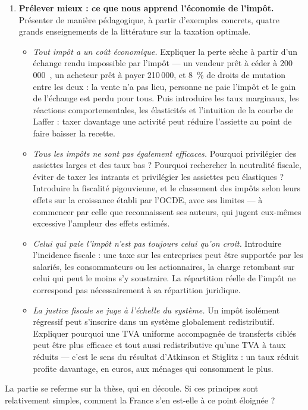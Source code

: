 \documentclass[11pt,a4paper]{article}
\providecommand{\euro}{\texteuro}
\newenvironment{chapitres}[1]
{\begin{enumerate}[leftmargin=1.6em,itemsep=0.15em,parsep=0pt,topsep=0.20em,start=#1]}
{\end{enumerate}}
\newenvironment{args}
{\begin{itemize}[leftmargin=1.1em,itemsep=0.1em,parsep=0pt,topsep=0.12em,label=\textbullet]}
{\end{itemize}}
\begin{document}
\begin{chapitres}{1}
\item \textbf{Prélever mieux : ce que nous apprend l'économie de l'impôt.} Présenter de manière
pédagogique, à partir d'exemples concrets, quatre grands enseignements de la littérature sur la
taxation optimale.
\begin{args}
\item \emph{Tout impôt a un coût économique.} Expliquer la perte sèche à partir d'un échange rendu
impossible par l'impôt --- un vendeur prêt à céder à 200\,000~\euro{}, un acheteur prêt à payer
210\,000, et 8~\% de droits de mutation entre les deux : la vente n'a pas lieu, personne ne paie
l'impôt et le gain de l'échange est perdu pour tous. Puis introduire les taux marginaux, les
réactions comportementales, les élasticités et l'intuition de la courbe de Laffer : taxer davantage
une activité peut réduire l'assiette au point de faire baisser la recette.
\item \emph{Tous les impôts ne sont pas également efficaces.} Pourquoi privilégier des assiettes
larges et des taux bas ? Pourquoi rechercher la neutralité fiscale, éviter de taxer les intrants et
privilégier les assiettes peu élastiques ? Introduire la fiscalité pigouvienne, et le classement des
impôts selon leurs effets sur la croissance établi par l'OCDE, avec ses limites --- à commencer par
celle que reconnaissent ses auteurs, qui jugent eux-mêmes excessive l'ampleur des effets estimés.
\item \emph{Celui qui paie l'impôt n'est pas toujours celui qu'on croit.} Introduire l'incidence
fiscale : une taxe sur les entreprises peut être supportée par les salariés, les consommateurs ou
les actionnaires, la charge retombant sur celui qui peut le moins s'y soustraire. La répartition
réelle de l'impôt ne correspond pas nécessairement à sa répartition juridique.
\item \emph{La justice fiscale se juge à l'échelle du système.} Un impôt isolément régressif peut
s'inscrire dans un système globalement redistributif. Expliquer pourquoi une TVA uniforme accompagnée
de transferts ciblés peut être plus efficace et tout aussi redistributive qu'une TVA à taux réduits
--- c'est le sens du résultat d'Atkinson et Stiglitz : un taux réduit profite davantage, en euros,
aux ménages qui consomment le plus.
\end{args}
\end{chapitres}

La partie se referme sur la thèse, qui en découle. Si ces principes sont relativement simples,
comment la France s'en est-elle à ce point éloignée ?
\end{document}
